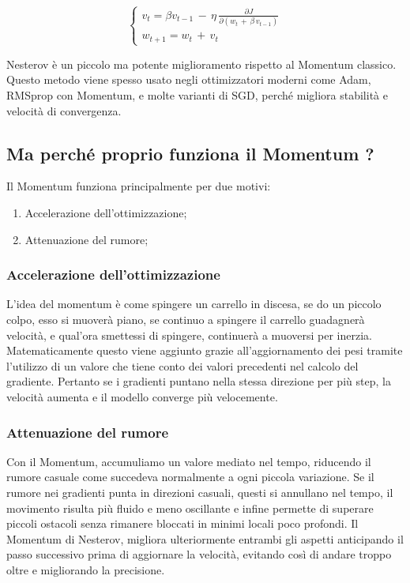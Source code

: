 \begin{equation}
\left\{\begin{array}{c}
    v_{t} = \beta v_{t-1}\,-\,\eta\,\frac{\partial J}{\partial(w_t\,+\,\beta\,v_{t-1})}\\
    w_{t+1} = w_t\,+\,v_t
    \end{array}\right.
\end{equation}

Nesterov è un piccolo ma potente miglioramento rispetto al Momentum classico. Questo metodo viene spesso usato negli ottimizzatori moderni come Adam, RMSprop con Momentum, e molte varianti di SGD, perché migliora stabilità e velocità di convergenza.

\subsection{Ma perché proprio funziona il Momentum ?}
Il Momentum funziona principalmente per due motivi:
\begin{enumerate}
    \item Accelerazione dell'ottimizzazione;
    \item Attenuazione del rumore;
\end{enumerate}

\subsubsection{Accelerazione dell'ottimizzazione}
L'idea del momentum è come spingere un carrello in discesa, se do un piccolo colpo, esso si muoverà piano, se continuo a spingere il carrello guadagnerà velocità, e qual'ora smettessi di spingere, continuerà a muoversi per inerzia. Matematicamente questo viene aggiunto grazie all'aggiornamento dei pesi tramite l'utilizzo di un valore che tiene conto dei valori precedenti nel calcolo del gradiente. Pertanto se i gradienti puntano nella stessa direzione per più step, la velocità aumenta e il modello converge più velocemente.
\subsubsection{Attenuazione del rumore}
Con il Momentum, accumuliamo un valore mediato nel tempo, riducendo il rumore casuale come succedeva normalmente a ogni piccola variazione. Se il rumore nei gradienti punta in direzioni casuali, questi si annullano nel tempo, il movimento risulta più fluido e meno oscillante e infine permette di superare piccoli ostacoli senza rimanere bloccati in minimi locali poco profondi. Il Momentum di Nesterov, migliora ulteriormente entrambi gli aspetti anticipando il passo successivo prima di aggiornare la velocità, evitando così di andare troppo oltre e migliorando la precisione.
